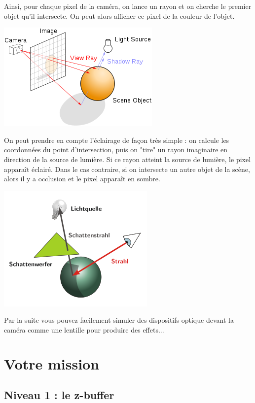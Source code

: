 \documentclass[a4paper, 11pt]{article}
\begin{document}
Ainsi, pour chaque pixel de la caméra, on lance un rayon et on cherche le premier objet qu'il intersecte. On peut alors afficher ce pixel de la couleur de l'objet. 
  
\begin{center}
\includegraphics[scale=0.8]{300px-Ray_trace_diagram.png} 
\end{center}

On peut prendre en compte l'éclairage de façon très simple : on calcule les coordonnées du point d'intersection, puis on "tire" un rayon imaginaire en direction de la source de lumière. Si ce rayon atteint la source de lumière, le pixel apparaît éclairé. Dans le cas contraire, si on intersecte un autre objet de la scène, alors il y a occlusion et le pixel apparaît en sombre.  

\begin{center}
\includegraphics[scale=0.8]{290px-Raytracing-Schattenstrahl.png} 
\end{center}  
Par la suite vous pouvez facilement simuler des dispositifs optique devant la caméra comme une lentille pour produire des effets...  
\newpage

\section{Votre mission}
\subsection*{Niveau 1 : le z-buffer}
\end{document}
